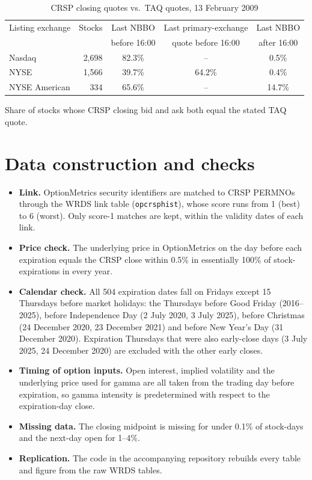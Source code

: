 \documentclass[11pt,a4paper]{article}
\begin{document}
\begin{table}[ht]
\centering
\begin{threeparttable}
\caption{CRSP closing quotes vs.\ TAQ quotes, 13 February 2009}
\label{tab:proxy}
\small
\begin{tabular}{lrccc}
\toprule
Listing exchange & Stocks & Last NBBO & Last primary-exchange & Last NBBO \\
 & & before 16:00 & quote before 16:00 & after 16:00 \\
\midrule
Nasdaq & 2,698 & 82.3\% & -- & 0.5\% \\
NYSE & 1,566 & 39.7\% & 64.2\% & 0.4\% \\
NYSE American & 334 & 65.6\% & -- & 14.7\% \\
\bottomrule
\end{tabular}
\begin{tablenotes}\footnotesize
\item Share of stocks whose CRSP closing bid and ask both equal the stated TAQ quote.
\end{tablenotes}
\end{threeparttable}
\end{table}

\section{Data construction and checks}

\begin{itemize}
\item \textbf{Link.} OptionMetrics security identifiers are matched to CRSP PERMNOs through the WRDS link table (\texttt{opcrsphist}), whose score runs from 1 (best) to 6 (worst). Only score-1 matches are kept, within the validity dates of each link.
\item \textbf{Price check.} The underlying price in OptionMetrics on the day before each expiration equals the CRSP close within 0.5\% in essentially 100\% of stock-expirations in every year.
\item \textbf{Calendar check.} All 504 expiration dates fall on Fridays except 15 Thursdays before market holidays: the Thursdays before Good Friday (2016--2025), before Independence Day (2 July 2020, 3 July 2025), before Christmas (24 December 2020, 23 December 2021) and before New Year's Day (31 December 2020). Expiration Thursdays that were also early-close days (3 July 2025, 24 December 2020) are excluded with the other early closes.
\item \textbf{Timing of option inputs.} Open interest, implied volatility and the underlying price used for gamma are all taken from the trading day before expiration, so gamma intensity is predetermined with respect to the expiration-day close.
\item \textbf{Missing data.} The closing midpoint is missing for under 0.1\% of stock-days and the next-day open for 1--4\%.
\item \textbf{Replication.} The code in the accompanying repository rebuilds every table and figure from the raw WRDS tables.
\end{itemize}
\end{document}
